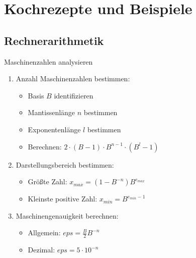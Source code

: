 \section{Kochrezepte und Beispiele}

\subsection{Rechnerarithmetik}

\begin{KR}{Maschinenzahlen analysieren}
\begin{enumerate}
    \item Anzahl Maschinenzahlen bestimmen:
    \begin{itemize}
        \item Basis $B$ identifizieren 
        \item Mantissenlänge $n$ bestimmen
        \item Exponentenlänge $l$ bestimmen
        \item Berechnen: $2 \cdot (B-1) \cdot B^{n-1} \cdot (B^l-1)$
    \end{itemize}
    \item Darstellungsbereich bestimmen:
    \begin{itemize}
        \item Größte Zahl: $x_{max} = (1-B^{-n})B^{e_{max}}$
        \item Kleinste positive Zahl: $x_{min} = B^{e_{min}-1}$
    \end{itemize}
    \item Maschinengenauigkeit berechnen:
    \begin{itemize}
        \item Allgemein: $eps = \frac{B}{2}B^{-n}$
        \item Dezimal: $eps = 5 \cdot 10^{-n}$
    \end{itemize}
\end{enumerate}
\end{KR}

